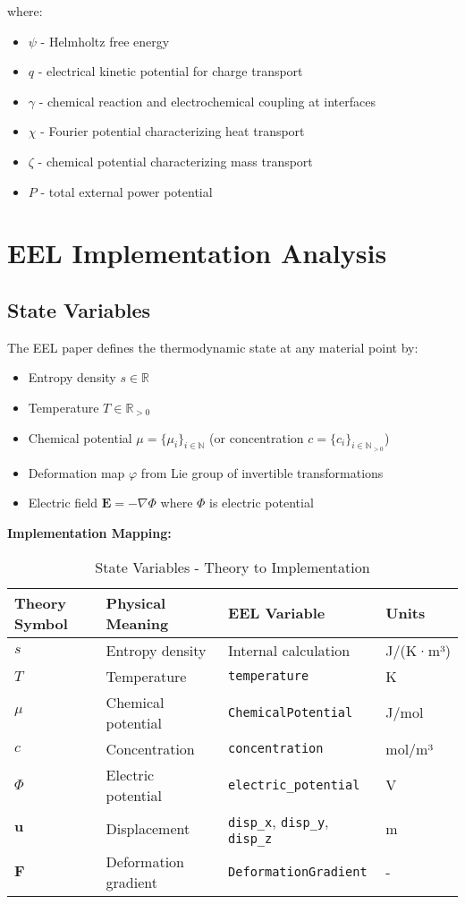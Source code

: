 \documentclass[11pt,a4paper]{article}
\begin{document}
where:
\begin{itemize}
\item $\psi$ - Helmholtz free energy
\item $q$ - electrical kinetic potential for charge transport
\item $\gamma$ - chemical reaction and electrochemical coupling at interfaces
\item $\chi$ - Fourier potential characterizing heat transport
\item $\zeta$ - chemical potential characterizing mass transport
\item $P$ - total external power potential
\end{itemize}

\section{EEL Implementation Analysis}

\subsection{State Variables}

The EEL paper defines the thermodynamic state at any material point by:
\begin{itemize}
\item Entropy density $s \in \mathbb{R}$ 
\item Temperature $T \in \mathbb{R}_{>0}$
\item Chemical potential $\mu = \{\mu_i\}_{i \in \mathbb{N}}$ (or concentration $c = \{c_i\}_{i \in \mathbb{N}_{>0}}$)
\item Deformation map $\varphi$ from Lie group of invertible transformations
\item Electric field $\mathbf{E} = -\nabla\Phi$ where $\Phi$ is electric potential
\end{itemize}

\textbf{Implementation Mapping:}
\begin{table}[H]
\centering
\caption{State Variables - Theory to Implementation}
\begin{tabular}{@{}llll@{}}
\toprule
\textbf{Theory Symbol} & \textbf{Physical Meaning} & \textbf{EEL Variable} & \textbf{Units} \\
\midrule
$s$ & Entropy density & Internal calculation & J/(K·m³) \\
$T$ & Temperature & \texttt{temperature} & K \\
$\mu$ & Chemical potential & \texttt{ChemicalPotential} & J/mol \\
$c$ & Concentration & \texttt{concentration} & mol/m³ \\
$\Phi$ & Electric potential & \texttt{electric\_potential} & V \\
$\mathbf{u}$ & Displacement & \texttt{disp\_x}, \texttt{disp\_y}, \texttt{disp\_z} & m \\
$\mathbf{F}$ & Deformation gradient & \texttt{DeformationGradient} & - \\
\bottomrule
\end{tabular}
\end{table}
\end{document}
